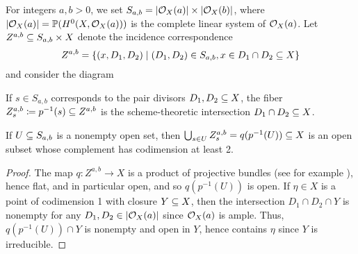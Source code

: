 For integers $a, b > 0$, we set $S_{a,b} = |\mathcal{O}_X(a)| \times |\mathcal{O}_X(b)|$, where $|\mathcal{O}_X(a)| = \mathbb{P}(H^0(X, \mathcal{O}_X(a)))$ is the complete linear system of $\mathcal{O}_X(a)$. Let $Z^{a,b} \subseteq S_{a,b} \times X$ denote the incidence correspondence
\[ Z^{a,b} = \{ (x, D_1, D_2) \;|\; (D_1, D_2) \in S_{a,b}, x \in D_1 \cap D_2 \subseteq X \} \]
and consider the diagram
\begin{center}
\end{center}
If $s \in S_{a,b}$ corresponds to the pair divisors $D_1, D_2 \subseteq X$, the fiber $Z_s^{a,b} \coloneqq p^{-1}(s) \subseteq Z^{a,b}$ is the scheme-theoretic intersection $D_1 \cap D_2 \subseteq X$.

\begin{lem}\label{codim2union}
    If $U \subseteq S_{a,b}$ is a nonempty open set, then $\bigcup_{s \in U} Z^{a,b}_s = q(p^{-1}(U)) \subseteq X$ is an open subset whose complement has codimension at least 2.
\end{lem}
\begin{proof}
    The map $q: Z^{a,b} \to X$ is a product of projective bundles (see for example \cite[Section 3.1]{HL}), hence flat, and in particular open, and so $q(p^{-1}(U))$ is open. If $\eta \in X$ is a point of codimension 1 with closure $Y \subseteq X$, then the intersection $D_1 \cap D_2 \cap Y$ is nonempty for any $D_1, D_2 \in |\mathcal{O}_X(a)|$ since $\mathcal{O}_X(a)$ is ample. Thus, $q(p^{-1}(U)) \cap Y$ is nonempty and open in $Y$, hence contains $\eta$ since $Y$ is irreducible.
\end{proof}

